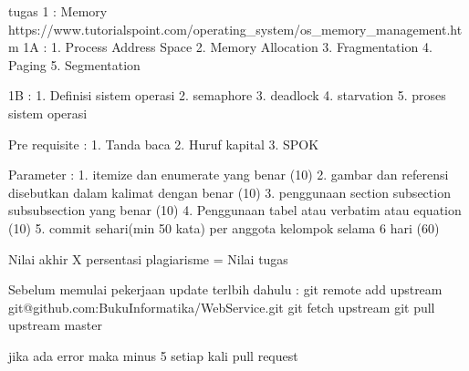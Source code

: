 tugas 1 :
Memory
https://www.tutorialspoint.com/operating_system/os_memory_management.htm
1A :
1. Process Address Space
2. Memory Allocation
3. Fragmentation
4. Paging
5. Segmentation

1B :
1. Definisi sistem operasi
2. semaphore
3. deadlock
4. starvation
5. proses sistem operasi

Pre requisite :
1. Tanda baca
2. Huruf kapital
3. SPOK

Parameter :
1. itemize dan enumerate yang benar (10)
2. gambar dan referensi disebutkan dalam kalimat dengan benar (10)
3. penggunaan section subsection subsubsection yang benar (10)
4. Penggunaan tabel atau verbatim atau equation (10)
5. commit sehari(min 50 kata) per anggota kelompok selama 6 hari (60)

Nilai akhir X persentasi plagiarisme = Nilai tugas

Sebelum memulai pekerjaan update terlbih dahulu :
git remote add upstream git@github.com:BukuInformatika/WebService.git
git fetch upstream
git pull upstream master

jika ada error maka minus 5 setiap kali pull request
